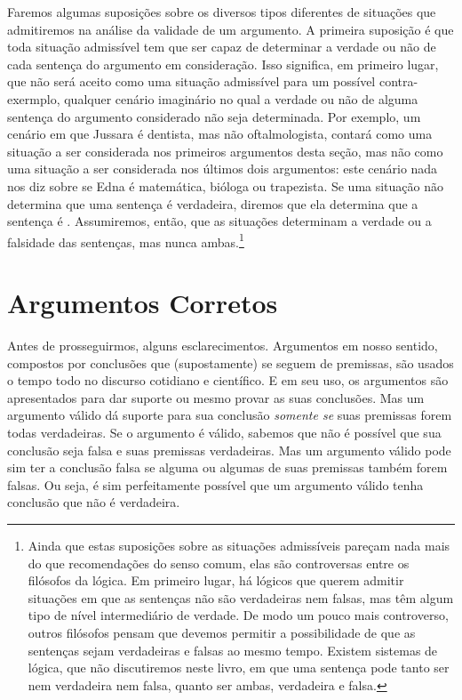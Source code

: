 Faremos algumas suposições sobre os diversos tipos diferentes de situações que admitiremos na análise da validade de um argumento.
A primeira suposição é que toda situação admissível tem que ser capaz de determinar a verdade ou não de cada sentença do argumento em consideração.
Isso significa, em primeiro lugar, que não será aceito como uma situação admissível para um possível contra-exermplo, qualquer cenário imaginário no qual a verdade ou não de alguma sentença do argumento considerado não seja determinada.
Por exemplo, um cenário em que Jussara é dentista, mas não oftalmologista, contará como uma situação a ser considerada nos primeiros argumentos desta seção, mas não como uma situação a ser considerada nos últimos dois argumentos:
este cenário nada nos diz sobre se Edna é matemática, bióloga ou trapezista.
Se uma situação não determina que uma sentença é verdadeira, diremos que ela determina que a sentença é .
Assumiremos, então, que as situações determinam a verdade ou a falsidade das sentenças, mas nunca ambas.\footnote{
	Ainda que estas suposições sobre as situações admissíveis pareçam nada mais do que recomendações do senso comum, elas são controversas entre os filósofos da lógica.
Em primeiro lugar, há lógicos que querem admitir situações em que as sentenças não são verdadeiras nem falsas, mas têm algum tipo de nível intermediário de verdade.
De modo um pouco mais controverso, outros filósofos pensam que devemos permitir a possibilidade de que as sentenças sejam verdadeiras e falsas ao mesmo tempo. Existem sistemas de lógica, que não discutiremos neste livro, em que uma sentença pode tanto ser nem verdadeira nem falsa, quanto ser ambas, verdadeira e falsa.}


\section{Argumentos Corretos}

Antes de prosseguirmos, alguns esclarecimentos.
Argumentos em nosso sentido, compostos por conclusões que (supostamente) se seguem de premissas, são usados o tempo todo no discurso cotidiano e científico.
E em seu uso, os argumentos são apresentados para dar suporte ou mesmo provar as suas conclusões.
Mas um argumento válido dá suporte para sua conclusão \emph{somente se} suas premissas forem todas verdadeiras.
Se o argumento é válido, sabemos que não é possível que sua conclusão seja falsa e suas premissas verdadeiras.
Mas um argumento válido pode sim ter a conclusão falsa se alguma ou algumas de suas premissas também forem falsas.
Ou seja, é sim perfeitamente possível que um argumento válido tenha conclusão que não é verdadeira.

